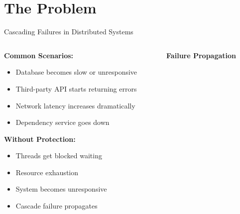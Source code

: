 \documentclass[aspectratio=169]{beamer}
\newcommand{\alertred}[1]{\textcolor{red}{#1}}
\begin{document}
\section{The Problem}

\begin{frame}{Cascading Failures in Distributed Systems}
    \begin{columns}
        \begin{column}{0.6\textwidth}
            \textbf{Common Scenarios:}
            \begin{itemize}
                \item Database becomes slow or unresponsive
                \item Third-party API starts returning errors
                \item Network latency increases dramatically
                \item Dependency service goes down
            \end{itemize}
            
            \vspace{0.5cm}
            \textbf{Without Protection:}
            \begin{itemize}
                \item[\alertred{\faTimes}] Threads get blocked waiting
                \item[\alertred{\faTimes}] Resource exhaustion
                \item[\alertred{\faTimes}] System becomes unresponsive
                \item[\alertred{\faTimes}] Cascade failure propagates
            \end{itemize}
        \end{column}
        \begin{column}{0.4\textwidth}
            \begin{center}
                \textbf{Failure Propagation}
\end{center}
\end{column}
\end{columns}
\end{frame}
\end{document}
